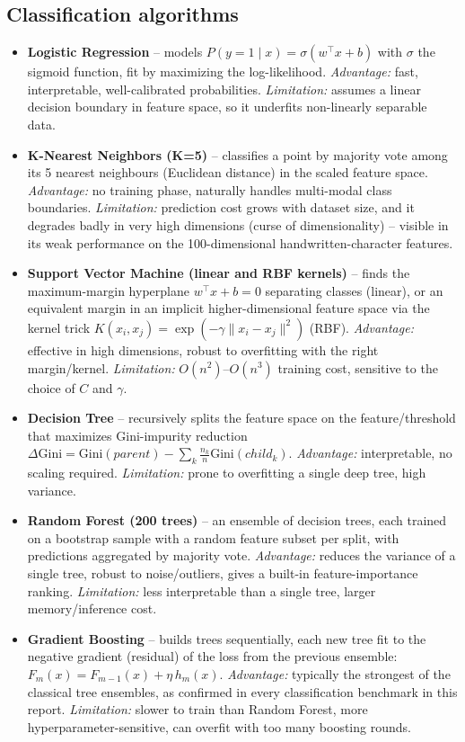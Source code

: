 \documentclass[12pt,a4paper]{article}
\begin{document}
\subsection{Classification algorithms}
\begin{itemize}
\item \textbf{Logistic Regression} -- models $P(y=1\mid x)=\sigma(w^\top x + b)$ with $\sigma$ the sigmoid function, fit by maximizing the log-likelihood. \textit{Advantage:} fast, interpretable, well-calibrated probabilities. \textit{Limitation:} assumes a linear decision boundary in feature space, so it underfits non-linearly separable data.
\item \textbf{K-Nearest Neighbors (K=5)} -- classifies a point by majority vote among its 5 nearest neighbours (Euclidean distance) in the scaled feature space. \textit{Advantage:} no training phase, naturally handles multi-modal class boundaries. \textit{Limitation:} prediction cost grows with dataset size, and it degrades badly in very high dimensions (curse of dimensionality) -- visible in its weak performance on the 100-dimensional handwritten-character features.
\item \textbf{Support Vector Machine (linear and RBF kernels)} -- finds the maximum-margin hyperplane $w^\top x+b=0$ separating classes (linear), or an equivalent margin in an implicit higher-dimensional feature space via the kernel trick $K(x_i,x_j)=\exp(-\gamma\lVert x_i-x_j\rVert^2)$ (RBF). \textit{Advantage:} effective in high dimensions, robust to overfitting with the right margin/kernel. \textit{Limitation:} $O(n^2)$--$O(n^3)$ training cost, sensitive to the choice of $C$ and $\gamma$.
\item \textbf{Decision Tree} -- recursively splits the feature space on the feature/threshold that maximizes Gini-impurity reduction $\Delta \mathrm{Gini}=\mathrm{Gini}(parent)-\sum_k \frac{n_k}{n}\mathrm{Gini}(child_k)$. \textit{Advantage:} interpretable, no scaling required. \textit{Limitation:} prone to overfitting a single deep tree, high variance.
\item \textbf{Random Forest (200 trees)} -- an ensemble of decision trees, each trained on a bootstrap sample with a random feature subset per split, with predictions aggregated by majority vote. \textit{Advantage:} reduces the variance of a single tree, robust to noise/outliers, gives a built-in feature-importance ranking. \textit{Limitation:} less interpretable than a single tree, larger memory/inference cost.
\item \textbf{Gradient Boosting} -- builds trees sequentially, each new tree fit to the negative gradient (residual) of the loss from the previous ensemble: $F_m(x)=F_{m-1}(x)+\eta\, h_m(x)$. \textit{Advantage:} typically the strongest of the classical tree ensembles, as confirmed in every classification benchmark in this report. \textit{Limitation:} slower to train than Random Forest, more hyperparameter-sensitive, can overfit with too many boosting rounds.

\end{itemize}
\end{document}

